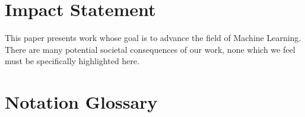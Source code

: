 \documentclass{article}
\theoremstyle{plain}
\theoremstyle{definition}
\theoremstyle{remark}
\begin{document}
\section*{Impact Statement}

This paper presents work whose goal is to advance the field of Machine
Learning. There are many potential societal consequences of our work, none
which we feel must be specifically highlighted here.







\newpage
\appendix
\onecolumn


\section{Notation Glossary}\label{sect:glossary}
\end{document}
